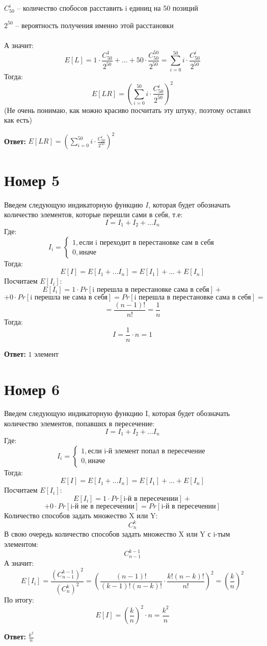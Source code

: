 \documentclass[a4paper,12pt]{article}
\begin{document}
$C^i_{50}$ -- количество спобосов расставить i единиц на 50 позиций

$2^{50}$ -- вероятность получения именно этой расстановки
\\\\
А значит:
\[
E[L] = 1 \cdot \frac{C^1_{50}}{2^{50}} + \ldots + 50 \cdot \frac{C^{50}_{50}}{2^{50}} =\sum_{i = 0}^{50} i \cdot \frac{C^i_{50}}{2^{50}}
\]
Тогда:
\[
E[LR]  = \left(\sum_{i = 0}^{50} i \cdot \frac{C^i_{50}}{2^{50}} \right)^2
\]
(Не очень понимаю, как можно красиво посчитать эту штуку, поэтому оставил как есть)
\begin{center}
\textbf{Ответ: } $E[LR]  = \left(\sum_{i = 0}^{50} i \cdot \frac{C^i_{50}}{2^{50}} \right)^2$
\end{center}
\section*{Номер 5}
Введем следующую индикаторную функцию $I$, которая будет обозначать количество элементов, которые перешли сами в себя, т.е:
\[
I = I_1 + I_2 + \ldots I_n
\]
Где:
\[
I_i = 
\begin{cases}
1, \text {если i переходит в перестановке сам в себя} \\
0, \text {иначе}
\end{cases}
\]
Тогда:
\[
E[I] = E[I_1 + \ldots I_n] = E[I_1] + \ldots + E[I_n]
\]
Посчитаем $E[I_i]$:
\[
E[I_i] = 1 \cdot Pr[\text{i перешла в перестановке сама в себя}] + 
\]
\[
+
0 \cdot Pr[\text{i перешла не сама в себя}] = Pr[\text{i перешла в перестановке сама в себя}] 
=
\]
\[
= \frac{(n-1)!}{n!} = \frac{1}{n}
\]
Тогда:
\[
I = \frac{1}{n} \cdot n = 1
\]
\begin{center}
\textbf{Ответ: } $1$ элемент
\end{center}
\section*{Номер 6}
Введем следующую индикаторную функцию I, которая будет обозначать количество элементов, попавших  в пересечение:
\[
I = I_1 + I_2 + \ldots I_n
\]
Где:
\[
I_i = 
\begin{cases}
1, \text {если i-й элемент попал в пересечение} \\
0, \text {иначе}
\end{cases}
\]
Тогда:
\[
E[I] = E[I_1 + \ldots I_n] = E[I_1] + \ldots + E[I_n]
\]
Посчитаем $E[I_i]$:
\[
E[I_i] = 1 \cdot Pr[\text{i-й в пересечении}] + 
\]
\[
+
0 \cdot Pr[\text{i-й не в пересечении}] = Pr[\text{i-й  в пересечении}] 
\]
Количество способов задать множество X или Y:
\[
C^k_n
\]
В свою очередь количество способов задать множество X или Y с i-тым элементом:
\[
C^{k-1}_{n-1}
\]
А значит:
\[
E[I_i] = \frac{\left(C^{k-1}_{n-1}\right)^2}{\left(C^k_n\right)^2} = \left(\frac{(n-1)!}{(k-1)!(n-k)!} \cdot \frac{k!(n-k)!}{n!}\right)^2 =  \left(\frac{k}{n}\right)^2
\]
По итогу:
\[
E[I] =\left( \frac{k}{n}\right)^2 \cdot n  = \frac{k^2}{n}
\]
\begin{center}
\textbf{Ответ: } $\frac{k^2}{n}$
\end{center}
\end{document}
